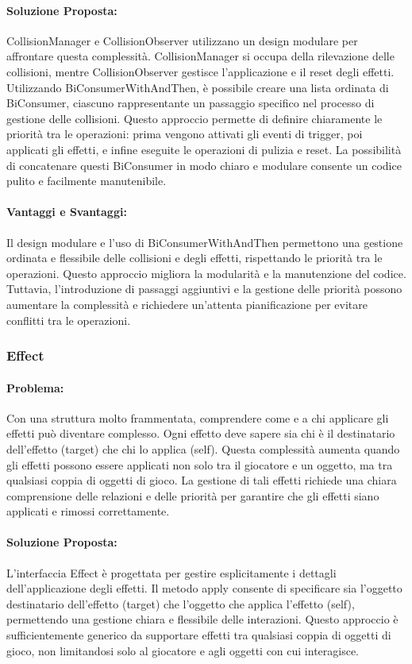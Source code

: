 \documentclass[a4paper,12pt]{report}
\begin{document}
\paragraph{Soluzione Proposta:}  CollisionManager e CollisionObserver utilizzano un design modulare per affrontare questa complessità. CollisionManager si occupa della rilevazione delle collisioni, mentre CollisionObserver gestisce l’applicazione e il reset degli effetti. Utilizzando BiConsumerWithAndThen, è possibile creare una lista ordinata di BiConsumer, ciascuno rappresentante un passaggio specifico nel processo di gestione delle collisioni. Questo approccio permette di definire chiaramente le priorità tra le operazioni: prima vengono attivati gli eventi di trigger, poi applicati gli effetti, e infine eseguite le operazioni di pulizia e reset. La possibilità di concatenare questi BiConsumer in modo chiaro e modulare consente un codice pulito e facilmente manutenibile.

\paragraph{Vantaggi e Svantaggi:}
Il design modulare e l’uso di BiConsumerWithAndThen permettono una gestione ordinata e flessibile delle collisioni e degli effetti, rispettando le priorità tra le operazioni. Questo approccio migliora la modularità e la manutenzione del codice. Tuttavia, l’introduzione di passaggi aggiuntivi e la gestione delle priorità possono aumentare la complessità e richiedere un’attenta pianificazione per evitare conflitti tra le operazioni.

\subsubsection{Effect}

\paragraph{Problema:} Con una struttura molto frammentata, comprendere come e a chi applicare gli effetti può diventare complesso. Ogni effetto deve sapere sia chi è il destinatario dell’effetto (target) che chi lo applica (self). Questa complessità aumenta quando gli effetti possono essere applicati non solo tra il giocatore e un oggetto, ma tra qualsiasi coppia di oggetti di gioco. La gestione di tali effetti richiede una chiara comprensione delle relazioni e delle priorità per garantire che gli effetti siano applicati e rimossi correttamente.
\paragraph{Soluzione Proposta:} L’interfaccia Effect è progettata per gestire esplicitamente i dettagli dell’applicazione degli effetti. Il metodo apply consente di specificare sia l’oggetto destinatario dell’effetto (target) che l’oggetto che applica l’effetto (self), permettendo una gestione chiara e flessibile delle interazioni. Questo approccio è sufficientemente generico da supportare effetti tra qualsiasi coppia di oggetti di gioco, non limitandosi solo al giocatore e agli oggetti con cui interagisce.
\end{document}
